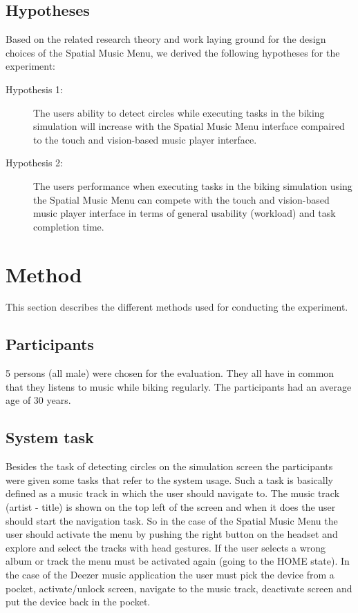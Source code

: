 \subsection{Hypotheses}
\label{sec:evaluationhypothesis}
Based on the related research theory and work laying ground for the design choices of the Spatial Music Menu, we derived the following hypotheses for the experiment:

\begin{description}
\item[Hypothesis 1:] The users ability to detect circles while executing tasks in the biking simulation will increase with the Spatial Music Menu interface compaired to the touch and vision-based music player interface.
\end{description}

\begin{description}
\item[Hypothesis 2:] The users performance when executing tasks in the biking simulation using the Spatial Music Menu can compete with the touch and vision-based music player interface in terms of general usability (workload) and task completion time.
\end{description}


\section{Method}
This section describes the different methods used for conducting the experiment.

\subsection{Participants}
5 persons (all male) were chosen for the evaluation. They all have in common that they listens to music while biking regularly. The participants had an average age of 30 years.

\subsection{System task}
Besides the task of detecting circles on the simulation screen the participants were given some tasks that refer to the system usage. Such a task is basically defined as a music track in which the user should navigate to. The music track (artist - title) is shown on the top left of the screen and when it does the user should start the navigation task. So in the case of the Spatial Music Menu the user should activate the menu by pushing the right button on the headset and explore and select the tracks with head gestures. If the user selects a wrong album or track the menu must be activated again (going to the HOME state). In the case of the Deezer music application the user must pick the device from a pocket, activate/unlock screen, navigate to the music track, deactivate screen and put the device back in the pocket.

